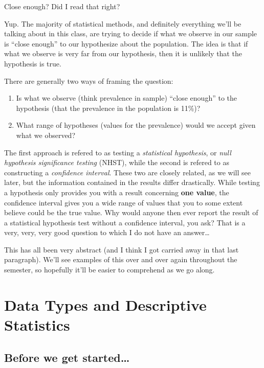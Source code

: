 \documentclass[]{book}
\providecommand{\tightlist}{%
  \setlength{\itemsep}{0pt}\setlength{\parskip}{0pt}}
\theoremstyle{definition}
\theoremstyle{definition}
\theoremstyle{definition}
\theoremstyle{remark}
\begin{document}
Close enough? Did I read that right?

Yup. The majority of statistical methods, and definitely everything we'll be talking about in this class, are trying to decide if what we observe in our sample is ``close enough'' to our hypothesize about the population. The idea is that if what we observe is very far from our hypothesis, then it is unlikely that the hypothesis is true.

There are generally two ways of framing the question:

\begin{enumerate}
\def\labelenumi{\arabic{enumi}.}
\tightlist
\item
  Is what we observe (think prevalence in sample) ``close enough'' to the hypothesis (that the prevalence in the population is 11\%)?
\item
  What range of hypotheses (values for the prevalence) would we accept given what we observed?
\end{enumerate}

The first approach is refered to as testing a \emph{statistical hypothesis}, or \emph{null hypothesis significance testing} (NHST), while the second is refered to as constructing a \emph{confidence interval}. These two are closely related, as we will see later, but the information contained in the results differ drastically. While testing a hypothesis only provides you with a result concerning \textbf{one value}, the confidence interval gives you a wide range of values that you to some extent believe could be the true value. Why would anyone then ever report the result of a statistical hypothesis test without a confidence interval, you ask? That is a very, very, very good question to which I do not have an answer\ldots{}

This has all been very abstract (and I think I got carried away in that last paragraph). We'll see examples of this over and over again throughout the semester, so hopefully it'll be easier to comprehend as we go along.

\hypertarget{part-data-types-and-descriptive-statistics}{%
\part{Data Types and Descriptive Statistics}\label{part-data-types-and-descriptive-statistics}}

\hypertarget{before-we-get-started}{%
\chapter{Before we get started\ldots{}}\label{before-we-get-started}}
\end{document}
